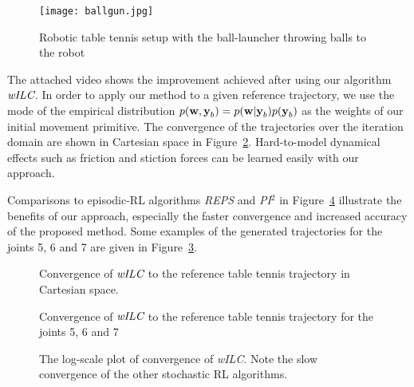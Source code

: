 

\begin{figure}
\center
\texttt{[image: ballgun.jpg]}			
\caption{Robotic table tennis setup with the ball-launcher throwing balls to the robot}
\label{ballgun}
\end{figure}

The attached video shows the improvement achieved after using our algorithm $\emph{wILC}$. In order to apply our method to a given reference trajectory, we use the mode of the empirical distribution $p(\boldsymbol{\mathrm{w}},\boldsymbol{\mathrm{y}}_b) = p(\boldsymbol{\mathrm{w}}|\boldsymbol{\mathrm{y}}_b)p(\boldsymbol{\mathrm{y}}_b)$ as the weights of our initial movement primitive. The convergence of the trajectories over the iteration domain are shown in Cartesian space in Figure~\ref{wILCTrajectoryTTCartesian}. Hard-to-model dynamical effects such as friction and stiction forces can be learned easily with our approach.

Comparisons to episodic-RL algorithms \emph{REPS} and \emph{PI$^{2}$} in Figure~\ref{ttComparison} illustrate the benefits of our approach, especially the faster convergence and increased accuracy of the proposed method. Some examples of the generated trajectories for the joints 5, 6 and 7 are given in Figure~\ref{wILCTrajectoryTT}. 

\begin{figure}
\center
\scalebox{1.0}{}
\caption{Convergence of $\emph{wILC}$ to the reference table tennis trajectory in Cartesian space.}
\label{wILCTrajectoryTTCartesian}
\end{figure}

\begin{figure}
\center
\scalebox{1.0}{}
\caption{Convergence of $\emph{wILC}$ to the reference table tennis trajectory for the joints 5, 6 and 7}
\label{wILCTrajectoryTT}
\end{figure}

\begin{figure}
\begingroup
\scalebox{0.5}{}
\endgroup
\caption{The log-scale plot of convergence of \emph{wILC}. Note the slow convergence of the other stochastic RL algorithms.}
\label{ttComparison}
\end{figure}